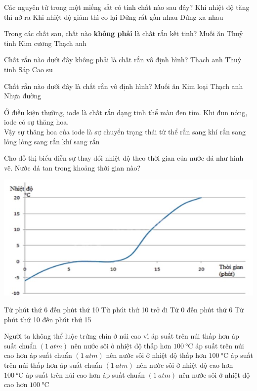 \begin{ex}
Các nguyên tử trong một miếng sắt có tính chất nào sau đây?
\choice
{ Khi nhiệt độ tăng thì nở ra}
{ Khi nhiệt độ giảm thì co lại}
{\True Đứng rất gần nhau}
{ Đứng xa nhau}
\end{ex}
\begin{ex}
Trong các chất sau, chất nào \textbf{không phải} là chất rắn kết tinh?
\choice
{ Muối ăn}
{\True Thuỷ tinh}
{ Kim cương}
{ Thạch anh}
\end{ex}
\begin{ex}
Chất rắn nào dưới đây không phải là chất rắn vô định hình?
\choice
{\True Thạch anh}
{ Thuỷ tinh}
{ Sáp}
{ Cao su}
\end{ex}
\begin{ex}
Chất rắn nào dưới đây là chất rắn vô định hình?
\choice
{ Muối ăn}
{ Kim loại}
{ Thạch anh}
{\True Nhựa đường}
\end{ex}
\begin{ex}
Ở điều kiện thường, iode là chất rắn dạng tinh thể màu đen tím. Khi đun nóng, iode có sự thăng hoa.\\
Vậy sự thăng hoa của iode là sự chuyển trạng thái từ thể
\choice
{\True rắn sang khí}
{ rắn sang lỏng}
{ lỏng sang rắn}
{ khí sang rắn}
\end{ex}
\begin{ex}
Cho đồ thị biểu diễn sự thay đổi nhiệt độ theo thời gian của nước đá như hình vẽ. Nước đá tan trong khoảng thời gian nào?
\begin{center}
\includegraphics[width=0.6\linewidth]{figs/VN12-Y24-PH-SYL-001P-1}
\end{center}
\choice
{\True Từ phút thứ 6 đến phút thứ 10}
{ Từ phút thứ 10 trở đi}
{ Từ 0 đến phút thứ 6}
{ Từ phút thứ 10 đến phút thứ 15}
\end{ex}
\begin{ex}
Người ta không thể luộc trứng chín ở núi cao vì
\choice
{\True áp suất trên núi thấp hơn áp suất chuẩn $\left(\SI{1}{atm}\right)$ nên nước sôi ở nhiệt độ thấp hơn $\SI{100}{\celsius}$}
{ áp suất trên núi cao hơn áp suất chuẩn $\left(\SI{1}{atm}\right)$ nên nước sôi ở nhiệt độ thấp hơn $\SI{100}{\celsius}$}
{ áp suất trên núi thấp hơn áp suất chuẩn $\left(\SI{1}{atm}\right)$ nên nước sôi ở nhiệt độ cao hơn $\SI{100}{\celsius}$}
{ áp suất trên núi cao hơn áp suất chuẩn $\left(\SI{1}{atm}\right)$ nên nước sôi ở nhiệt độ cao hơn $\SI{100}{\celsius}$}
\end{ex}
